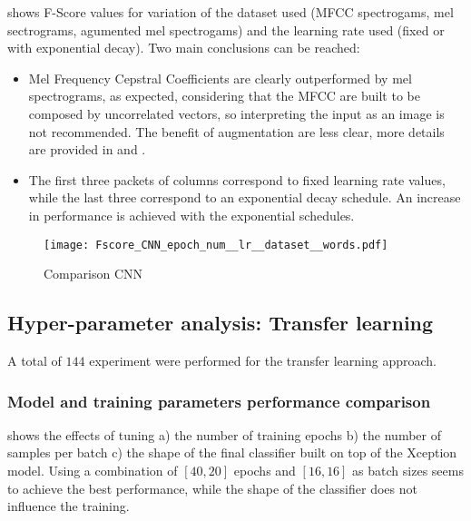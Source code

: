  shows F-Score values for
variation of
the dataset used (MFCC spectrogams, mel sectrograms, agumented mel spectrogams)
and the learning rate used (fixed or with exponential decay).
Two main conclusions can be reached:
\begin{itemize}
    \item 
        Mel Frequency Cepstral Coefficients are clearly outperformed by mel
        spectrograms, as expected, considering that the MFCC are built to be composed
        by uncorrelated vectors, so interpreting the input as an image is not
        recommended.
        The benefit of augmentation are less clear, more details are provided
        in  and
        .
    \item 
        The first three packets of columns correspond to fixed learning rate values,
        while the last three correspond to an exponential decay schedule.
        An increase in performance is achieved with the exponential schedules.
\end{itemize}

\begin{figure*}[h!]
    \centering
    \texttt{[image: Fscore\_CNN\_epoch\_num\_\_lr\_\_dataset\_\_words.pdf]}
    \caption{Comparison CNN}%
    \label{fig:cnn_comparison_epoch_lr_dataset}
\end{figure*}

\subsection{Hyper-parameter analysis: Transfer learning}

A total of $144$
experiment were performed for the transfer learning approach.


\subsubsection{Model and training parameters performance comparison}

 shows the effects of tuning
a)
the number of training epochs
b)
the number of samples per batch
c)
the shape of the final classifier built on top of the Xception model.
Using a combination of $[40, 20]$ epochs and $[16, 16]$ as batch sizes seems to
achieve the best performance, while the shape of the classifier does not
influence the training.

